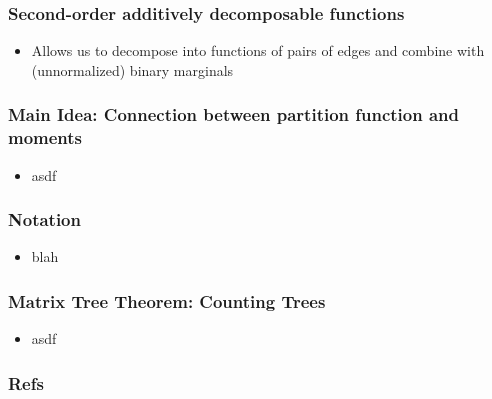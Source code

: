 \documentclass{beamer}
\begin{document}
\begin{frame}
\frametitle{Second-order additively decomposable functions}
\begin{itemize}
\item Allows us to decompose into functions of pairs of edges and combine with (unnormalized)
    binary marginals
\end{itemize}
\end{frame}

\begin{frame}
\frametitle{Main Idea: Connection between partition function and moments}
\begin{itemize}
\item asdf
\end{itemize}
\end{frame}

\begin{frame}
\frametitle{Notation}
\begin{itemize}
\item blah
\end{itemize}
\end{frame}

\begin{frame}
\frametitle{Matrix Tree Theorem: Counting Trees}
\begin{itemize}
    \item asdf
\end{itemize}
\end{frame}

\begin{frame}[allowframebreaks]
\frametitle{Refs}

\end{frame}
\end{document}
